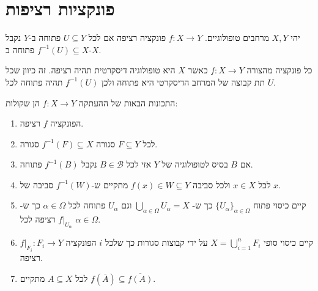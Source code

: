 \documentclass{tstextbook}
\begin{document}
\section{פונקציות רציפות}

\begin{definition}
יהי \(X,Y\) מרחבים טופולוגיים. \(f:X\to Y\) פונקציה רציפה אם לכל \(U \subseteq Y\) פתוחה ב-\(Y\) נקבל \(f^{-1}(U)\subseteq X\) פתוחה ב-\(X\).

\end{definition}
\begin{example}
כל פונקציה מהצורה \(f:X\to Y\) כאשר \(X\) היא טופולוגיה דיסקרטית תהיה רציפה. זה כיוון שכל תת קבוצה של המרחב הדיסקרטי היא פתוחה ולכן \(f^{-1}(U)\) תהיה פתוחה לכל \(U\).

\end{example}
\begin{proposition}
התכונות הבאות של ההעתקה \(f:X\to Y\) הן שקולות:

  \begin{enumerate}
    \item הפונקציה \(f\) רציפה. 


    \item לכל \(F\subseteq Y\) סגורה \(f^{-1}(F)\subseteq X\) סגורה. 


    \item אם \(B\) בסיס לטופולוגיה של \(Y\) אזי לכל \(B \in \mathcal{B}\) נקבל \(f^{-1}(B)\) פתוחה. 


    \item לכל \(x \in X\) ולכל סביבה \(f(x) \in W\subseteq Y\) מתקיים ש-\(f^{-1}(W)\) סביבה של \(x\). 


    \item קיים כיסוי פתוח \(\{ U_{\alpha} \}_{\alpha \in \Omega}\) כך ש- \(\bigcup_{\alpha \in \Omega}U_{\alpha}=X\) וגם \(U_{\alpha}\) פתוחה לכל \(\alpha \in \Omega\) כך ש-\(f|_{U_{\alpha}}\) רציפה לכל \(\alpha \in \Omega\). 


    \item קיים כיסוי סופי \(X=\bigcup_{i=1}^{n}F_{i}\) על ידי קבוצות סגורות כך שלכל \(i\) הפונקציה \(f|_{F_{i}}:F_{i}\to Y\) רציפה. 


    \item לכל \(A\subseteq X\) מתקיים \(f(\overline{A})\subseteq \overline{f(A)}\). 


  \end{enumerate}
\end{proposition}
\end{document}
